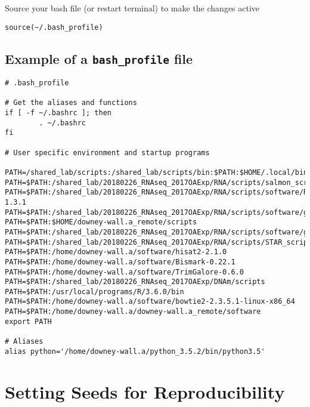 \documentclass[
  letterpaper,
  DIV=11,
  numbers=noendperiod]{scrreprt}
\begin{document}
Source your bash file (or restart terminal) to make the changes active

\begin{verbatim}
source(~/.bash_profile)
\end{verbatim}

\hypertarget{example-of-a-bash_profile-file}{%
\section*{\texorpdfstring{\textbf{Example of a \texttt{bash\_profile}
file}}{Example of a bash\_profile file}}\label{example-of-a-bash_profile-file}}


\begin{verbatim}
# .bash_profile

# Get the aliases and functions
if [ -f ~/.bashrc ]; then
        . ~/.bashrc
fi

# User specific environment and startup programs

PATH=/shared_lab/scripts:/shared_lab/scripts/bin:$PATH:$HOME/.local/bin
PATH=$PATH:/shared_lab/20180226_RNAseq_2017OAExp/RNA/scripts/salmon_scripts/
PATH=$PATH:/shared_lab/20180226_RNAseq_2017OAExp/RNA/scripts/software/RSEM/RSEM-1.3.1
PATH=$PATH:/shared_lab/20180226_RNAseq_2017OAExp/RNA/scripts/software/gffread
PATH=$PATH:$HOME/downey-wall.a_remote/scripts
PATH=$PATH:/shared_lab/20180226_RNAseq_2017OAExp/RNA/scripts/software/gffcompare
PATH=$PATH:/shared_lab/20180226_RNAseq_2017OAExp/RNA/scripts/STAR_scripts
PATH=$PATH:/home/downey-wall.a/software/hisat2-2.1.0
PATH=$PATH:/home/downey-wall.a/software/Bismark-0.22.1
PATH=$PATH:/home/downey-wall.a/software/TrimGalore-0.6.0
PATH=$PATH:/shared_lab/20180226_RNAseq_2017OAExp/DNAm/scripts
PATH=$PATH:/usr/local/programs/R/3.6.0/bin
PATH=$PATH:/home/downey-wall.a/software/bowtie2-2.3.5.1-linux-x86_64
PATH=$PATH:/home/downey-wall.a/downey-wall.a_remote/software
export PATH

# Aliases
alias python='/home/downey-wall.a/python_3.5.2/bin/python3.5'
\end{verbatim}

\hypertarget{setting-seeds-for-reproducibility}{%
\chapter{Setting Seeds for
Reproducibility}\label{setting-seeds-for-reproducibility}}
\end{document}
